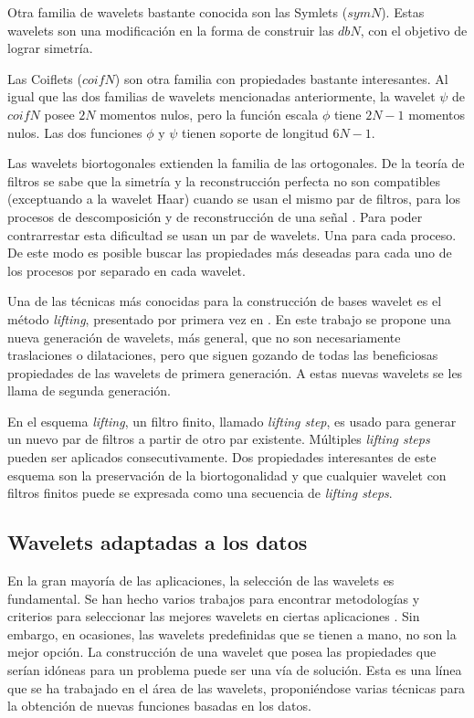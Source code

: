 Otra familia de wavelets bastante conocida son las Symlets ($symN$). Estas wavelets son una modificación en la forma
de construir las $dbN$, con el objetivo de lograr simetría.

Las Coiflets ($coifN$) \cite{daubechies1992} son otra familia con propiedades bastante interesantes. Al igual que las dos familias de 
wavelets mencionadas anteriormente, la wavelet $\psi$ de $coifN$ posee $2N$ momentos nulos, pero la función escala
$\phi$ tiene $2N-1$ momentos nulos. Las dos funciones $\phi$ y $\psi$ tienen soporte de longitud $6N-1$.

Las wavelets biortogonales extienden la familia de las ortogonales. De la teoría de filtros se sabe que
la simetría y la reconstrucción perfecta no son compatibles (exceptuando a la wavelet Haar)
cuando se usan el mismo par de filtros, para los procesos 
de descomposición y de reconstrucción de una señal \cite{misiti2007wavelets}. Para poder contrarrestar esta dificultad se usan un par de
wavelets. Una para cada proceso. De este modo es posible buscar las propiedades más deseadas para cada uno de
los procesos por separado en cada wavelet.

Una de las técnicas más conocidas para la construcción de bases wavelet es el método \textit{lifting}, presentado
por primera vez en \cite{lifting}. En este trabajo se propone una nueva generación de wavelets, más general, 
que no son necesariamente traslaciones 
o dilataciones, pero que siguen gozando de todas las beneficiosas propiedades de las wavelets 
de primera generación.
A estas nuevas wavelets se les llama de segunda generación. 

En el esquema \textit{lifting},
un filtro finito, llamado \textit{lifting step}, es usado para 
generar un nuevo par de filtros a partir de otro par existente. Múltiples \textit{lifting steps} pueden ser aplicados
consecutivamente. Dos propiedades interesantes de este esquema son la preservación de la biortogonalidad
y que cualquier wavelet con filtros finitos puede se expresada como una secuencia de \textit{lifting steps}.

\subsection{Wavelets adaptadas a los datos}\label{adapted-wavelets}

En la gran mayoría de las aplicaciones, la selección de las wavelets es fundamental. Se han hecho varios trabajos
para encontrar metodologías y criterios para seleccionar las mejores wavelets en ciertas aplicaciones \cite{ngui2013} \cite{doi:10.1177/14759217211010261}.
Sin embargo, en ocasiones, las wavelets predefinidas que se tienen a mano, no son la mejor opción.
La construcción de una wavelet que posea las propiedades que serían idóneas para un problema puede ser una
vía de solución. Esta es una línea que se ha trabajado en el área de las wavelets, proponiéndose varias
técnicas para la obtención de nuevas funciones basadas en los datos.

